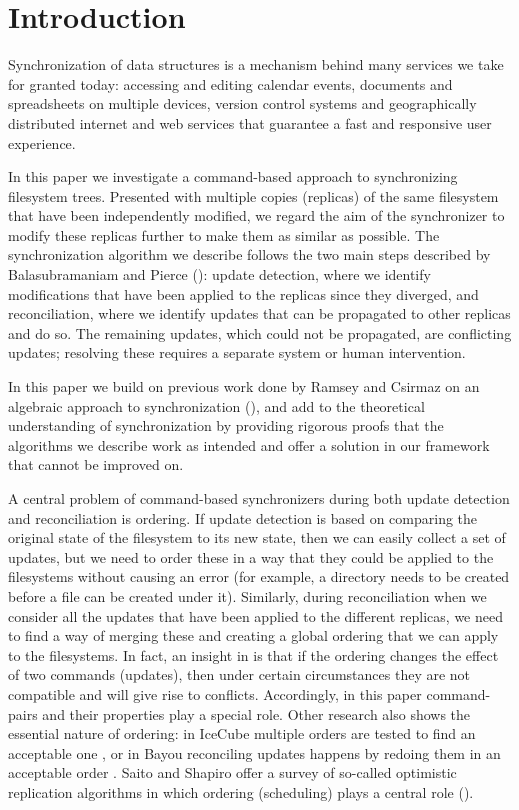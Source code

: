 
\section{Introduction}

Synchronization of data structures
is a mechanism behind many services we take for granted today:
accessing and editing calendar events, documents and spreadsheets
on multiple devices, version control systems and
geographically distributed internet and web services that
guarantee a fast and responsive user experience.

In this paper we investigate a command-based approach
to synchronizing filesystem trees.
Presented with multiple copies (replicas) of the same filesystem that have been independently modified,
we regard the aim of the synchronizer to modify these replicas further
to make them as similar as possible.
The synchronization algorithm we describe
follows the two main steps described by Balasubramaniam and Pierce (\cite{BP}):
update detection, where we identify modifications that have been applied to the replicas
since they diverged,
and reconciliation, where we identify updates that can be propagated to other replicas and do so.
The remaining updates, which could not be propagated, are conflicting updates;
resolving these requires a separate system or human intervention.

In this paper we build on previous work done 
by Ramsey and Csirmaz
on an algebraic approach to synchronization
(\cite{NREC}),
and add to the theoretical understanding
of synchronization by providing rigorous proofs that the algorithms
we describe work as intended
and offer a solution in our framework that cannot be improved on.

A central problem of command-based synchronizers 
during both update detection and reconciliation
is ordering.
If update detection is based on comparing the original state of the filesystem
to its new state, then we can easily collect a set of updates,
but we need to order these in a way that they could be applied
to the filesystems without causing an error 
(for example, a directory needs to be created before a file can be created under it).
Similarly, during reconciliation when we consider all the updates that
have been applied to the different replicas, we need to find a way of
merging these and creating a global ordering that we can apply
to the filesystems.
In fact, an insight in \cite{NREC} is that
if the ordering changes the effect of two commands (updates),
then under certain circumstances they are not compatible and will give rise to conflicts.
Accordingly, in this paper command-pairs and their properties
play a special role.
Other research also shows the essential nature of ordering:
in IceCube multiple orders are tested to find an acceptable one \cite{KRSD},
or in Bayou reconciling updates happens by redoing them in an acceptable order \cite{TTPDSH}.
Saito and Shapiro offer a survey of so-called optimistic replication algorithms in which
ordering (scheduling) plays a central role (\cite{SSH}).


